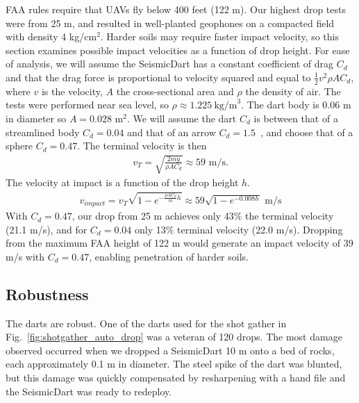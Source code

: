 FAA rules require that UAVs fly below 400 feet (122 m).
Our highest drop tests were from 25 m, and resulted in well-planted geophones on a compacted field with density 4 kg/cm$^2$.
Harder soils may require faster impact velocity, so this section examines possible impact velocities as a function of drop height.
For ease of analysis, we will assume the SeismicDart has a constant coefficient of drag $C_d$ and that the drag force is proportional to velocity squared and equal to $\frac{1}{2} v^2 \rho A C_d$, where $v$ is the velocity, $A$ the cross-sectional area and $\rho$ the density of air.
The tests were performed near sea level, so $\rho \approx 1.225~\text{kg/m}^3$.
The dart body is 0.06 m in diameter so $A=0.028$ m$^2$.
We will assume the dart $C_d$ is between that of a streamlined body $C_d=0.04$ and that of an arrow $C_d=1.5$~\cite{miyazaki2013aerodynamic}, and choose that of a sphere $C_d=0.47$.
The terminal velocity is then
\begin{align}
v_T = \sqrt{\frac{2 m g}{\rho A  C_d}} \approx 59 \text{ m/s.}
\end{align}
The velocity at impact is a function of the drop height $h$.
\begin{align}
v_{impact} = v_T  \sqrt{ 1 - e^{ -\frac{\rho A  C_d}{m} h }} \approx 59\sqrt{ 1 - e^{ -0.008 h }} \text{ m/s}
\end{align}
With  $C_d=0.47$, our drop from 25 m achieves only 43\% the terminal velocity (21.1 m/s), and for $C_d=0.04$ only 13\% terminal velocity  (22.0 m/s).
Dropping from the maximum FAA height of 122 m would generate an impact velocity of 39 m/s with $C_d=0.47$,  enabling penetration of harder soils.

\subsection{Robustness}
The darts are robust.
One of the darts used for the shot gather in Fig.~\ref{fig:shotgather_auto_drop} was a veteran of 120 drops.
The most damage observed occurred when we dropped a SeismicDart 10 m onto a bed of  rocks, each approximately  0.1 m in diameter.
The steel spike of the dart was blunted, but this damage was quickly compensated by resharpening with a hand file and the SeismicDart was ready to redeploy.
